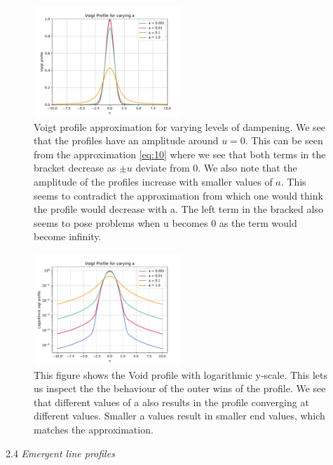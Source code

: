 \documentclass[a4paper,11.5pt,]{article}
\begin{document}
\begin{multicols}{2}
\begin{figure}[H]
	\centering
	\includegraphics[width=0.5\textwidth]{SSA/figures/voigt.pdf}
	\caption{Voigt profile approximation for varying levels of dampening. We see that the profiles have an amplitude around $u=0$. This can be seen from the approximation \eqref{eq:10} where we see that both terms in the bracket decrease as $\pm u$ deviate from 0. We also note that the amplitude of the profiles increase with smaller values of $a$. This seems to contradict the approximation from which one would think the profile would decrease with a. The left term in the bracked also seems to pose problems when u becomes 0 as the term would become infinity.}
	\label{fig:19}
\end{figure}

\begin{figure}[H]
	\centering
	\includegraphics[width=0.5\textwidth]{SSA/figures/voigtlog.pdf}
	\caption{This figure shows the Void profile with logarithmic y-scale. This lets us inspect the the behaviour of the outer wins of the profile. We see that different values of a also results in the profile converging at different values. Smaller a values result in smaller end values, which matches the approximation. }
	\label{fig:20}
\end{figure}

\newpage

\begin{center}
2.4\textit{ Emergent line profiles}
\end{center}


\end{multicols}
\end{document}
